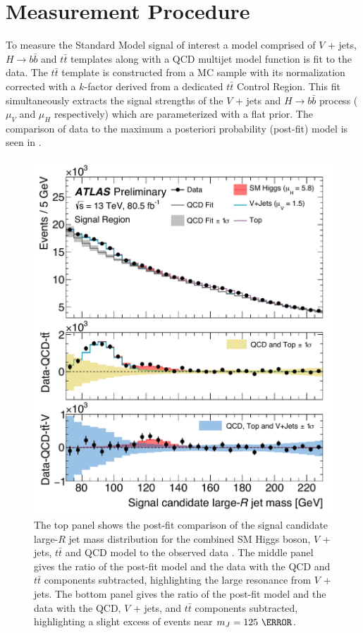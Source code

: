 \section{Measurement Procedure} \label{sec:results:procedure}

To measure the Standard Model signal of interest a model comprised of $V$ +
jets, $H \rightarrow b\bar{b}$ and $t\bar{t}$ templates along with a QCD
multijet model function is fit to the data. The $t\bar{t}$ template is constructed
from a MC sample with its normalization corrected with a $k$-factor derived
from a dedicated $t\bar{t}$ Control Region. This fit simultaneously extracts
the signal strengths of the $V$ + jets and $H \rightarrow b\bar{b}$ process
($\mu_{V}$ and $\mu_{H}$ respectively) which are parameterized with a flat
prior. The comparison of data to the maximum a posteriori probability (post-fit)
model is seen in .

\begin{figure}
\centering
\includegraphics[width=\linewidth]{figures/results/money_plot}
\caption{ 
The top panel shows the post-fit comparison of the signal candidate large-$R$
jet mass distribution for the combined SM Higgs boson, $V$ + jets, $t\bar{t}$
and QCD model to the observed data \cite{ATLAS-CONF-2018-052}.  The middle
panel gives the ratio of the post-fit model and the data with the QCD and
$t\bar{t}$ components subtracted, highlighting the large resonance from $V$ +
jets.  The bottom panel gives the ratio of the post-fit model and the data with
the QCD, $V$ + jets, and $t\bar{t}$ components subtracted, highlighting a
slight excess of events near $m_{J} = 125~\GeV$.}
\label{sec:results:money_plot}
\end{figure}

